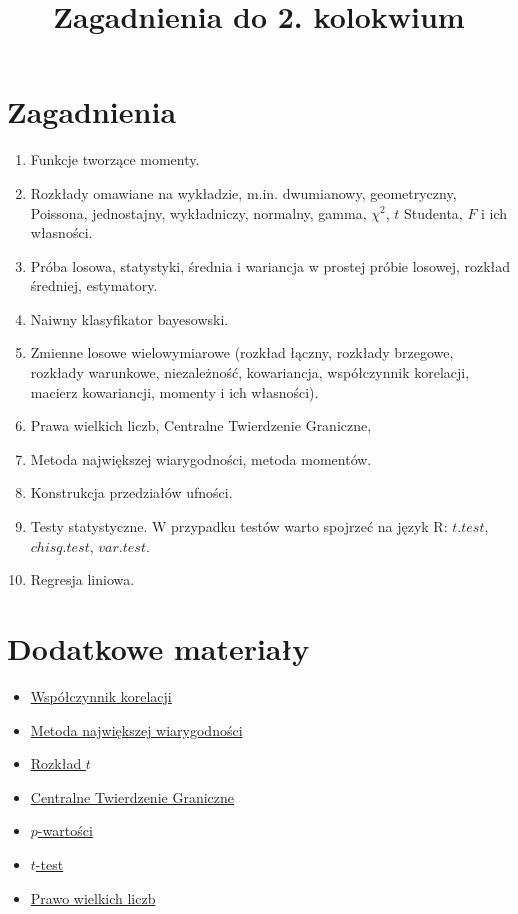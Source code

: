 \documentclass[polish]{article}
\title{Zagadnienia do 2. kolokwium}
\author{}
\date{}
\begin{document}
\maketitle

\section{Zagadnienia}
\begin{enumerate}
    \item Funkcje tworzące momenty.
    \item Rozkłady omawiane na wykładzie, m.in. dwumianowy, geometryczny, Poissona, jednostajny, wykładniczy, normalny, gamma, $\chi^2$, $t$ Studenta, $F$ i ich własności.
    \item Próba losowa, statystyki, średnia i wariancja w prostej próbie losowej, rozkład średniej, estymatory.
    \item Naiwny klasyfikator bayesowski.
    \item Zmienne losowe wielowymiarowe (rozkład łączny, rozkłady brzegowe, rozkłady warunkowe, niezależność, kowariancja, współczynnik korelacji, macierz kowariancji, momenty i ich własności). 
    \item Prawa wielkich liczb, Centralne Twierdzenie Graniczne, 
    \item Metoda największej wiarygodności, metoda momentów.
    \item Konstrukcja przedziałów ufności.
    \item Testy statystyczne. W przypadku testów warto spojrzeć na język R:  $t.test$, $chisq.test$, $var.test$. 
    \item Regresja liniowa. 
\end{enumerate}

\section{Dodatkowe materiały}
\begin{itemize}
    \item \href{https://rpsychologist.com/correlation/}{Współczynnik korelacji}
    \item \href{https://rpsychologist.com/likelihood/}{Metoda największej wiarygodności}
    \item \href{https://rpsychologist.com/d3/tdist/}{Rozkład $t$}
    \item \href{https://m.youtube.com/watch?v=zeJD6dqJ5lo}{Centralne Twierdzenie Graniczne}
    \item \href{https://m.youtube.com/watch?v=vemZtEM63GY}{$p$-wartości}
    \item \href{https://m.youtube.com/watch?v=VekJxtk4BYM}{$t$-test}
    \item \href{https://m.youtube.com/watch?v=MntX3zWNWec}{Prawo wielkich liczb}
\end{itemize}
\end{document}
